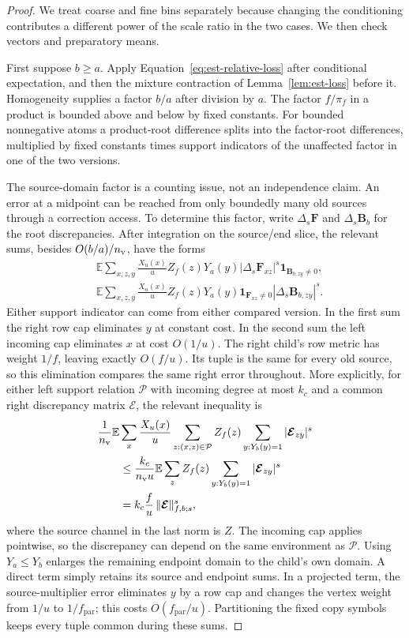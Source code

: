 \documentclass[11pt]{article}
\numberwithin{equation}{section}
\theoremstyle{definition}
\theoremstyle{remark}
\begin{document}
\begin{proof}
We treat coarse and fine bins separately because changing the conditioning contributes a different power of the scale ratio in the two cases. We then check vectors and preparatory means.

First suppose $b\ge a$.  Apply
Equation~\eqref{eq:est-relative-loss} after conditional expectation, and
then the mixture contraction of Lemma~\ref{lem:est-loss} before it.
Homogeneity supplies a factor $b/a$ after division by $a$.
The factor $f/\pi_f$ in a product is bounded above and below by fixed
constants.  For bounded nonnegative atoms a product-root difference splits
into the factor-root differences, multiplied by fixed constants times
support indicators of the unaffected factor in one of the two versions.

The source-domain factor is a counting issue, not an independence claim. An error at a midpoint can be reached from only boundedly many old sources through a correction access. To determine this factor, write
$\Delta_s{\mathbf{F}}$ and $\Delta_s{\mathbf{B}}_b$ for the root discrepancies.
After integration on the source/end slice, the relevant sums, besides
$O(b/a)/{n_{\rm v}}$, have the forms
\begin{align*}
 &\mathbb E\sum_{x,z,y}\frac{X_u(x)}u Z_f(z)Y_a(y)
       |\Delta_s{\mathbf{F}}_{xz}|^s
       \mathbf1_{{\mathbf{B}}_{b,zy}\ne0},\\
 &\mathbb E\sum_{x,z,y}\frac{X_u(x)}u Z_f(z)Y_a(y)
       \mathbf1_{{\mathbf{F}}_{xz}\ne0}
       |\Delta_s{\mathbf{B}}_{b,zy}|^s.
\end{align*}
Either support indicator can come from either compared version.  In the
first sum the right row cap eliminates $y$ at constant cost.  In the
second sum the left incoming cap eliminates $x$ at cost $O(1/u)$.
The right child's row metric has weight $1/f$, leaving exactly $O(f/u)$.
Its tuple is the same for every old source, so this elimination compares
the same right error throughout.  More explicitly, for either left
support relation $\mathcal P$ with incoming degree at most ${k}_c$ and
a common right discrepancy matrix $\boldsymbol{\mathcal E}$, the relevant inequality is
\begin{align*}
 &\frac1{n_{\rm v}}\mathbb E\sum_x\frac{X_u(x)}u
       \sum_{z:(x,z)\in\mathcal P}Z_f(z)
       \sum_{y:Y_b(y)=1}|\boldsymbol{\mathcal E}_{zy}|^s\\
 &\qquad\leq \frac{{k}_c}{{n_{\rm v}}u}\mathbb E\sum_z Z_f(z)
       \sum_{y:Y_b(y)=1}|\boldsymbol{\mathcal E}_{zy}|^s\\
 &\qquad={k}_c\frac fu\,\|\boldsymbol{\mathcal E}\|_{f,b;s}^s,
\end{align*}
where the source channel in the last norm is $Z$.
The incoming cap applies pointwise, so the discrepancy can depend on
the same environment as $\mathcal P$.
Using $Y_a\le Y_b$ enlarges the remaining
endpoint domain to the child's own domain.  A direct term simply retains
its source and endpoint sums.  In a projected term, the source-multiplier
error eliminates $y$ by a row cap and changes the vertex weight from
$1/u$ to $1/f_{\mathrm{par}}$; this costs $O(f_{\mathrm{par}}/u)$.
Partitioning the fixed copy symbols keeps every tuple common during these
sums.


\end{proof}
\end{document}
